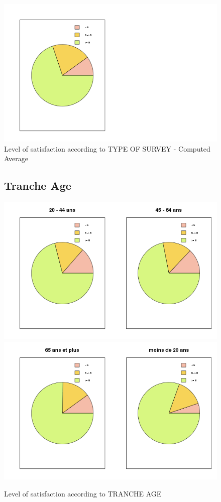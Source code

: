 \documentclass[a4paper, 11pt]{article}
\begin{document}
        
         \begin{figure}[!ht]
        	\centering
                 \includegraphics[width = 10 cm]{Remi/Level_of_satisfaction_according_to_TYPE_OF_SURVEY17.png}
                 \caption{Level of satisfaction according to TYPE OF SURVEY - Computed Average}
                 \label{fig:TYPE_OF_SURVEY17}
         \end{figure}

		\begin{figure}[!ht]
        \subsection{Tranche Age}
        	\centering
                \includegraphics[width = 10 cm]{Remi/Level_of_satisfaction_according_to_TRANCHE_AGE2.png}
                \includegraphics[width = 10 cm]{Remi/Level_of_satisfaction_according_to_TRANCHE_AGE4.png}
                \caption{Level of satisfaction according to TRANCHE AGE}
                \label{fig:TRANCHE_AGE4}
        \end{figure}
\end{document}
